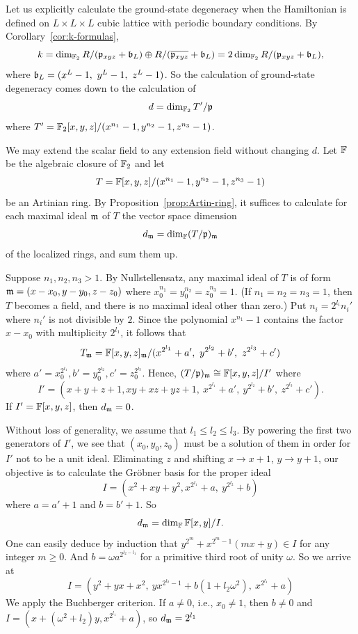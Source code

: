 Let us explicitly calculate the ground-state degeneracy
when the Hamiltonian is defined on $L \times L \times L$ 
cubic lattice with periodic boundary conditions.
By Corollary~\ref{cor:k-formulas},
\[
 k = \dim_{\mathbb{F}_2} R / (\mathfrak{p}_{xyz} + \mathfrak{b}_L) \oplus R / (\overline{\mathfrak{p}_{xyz}} + \mathfrak{b}_L) = 2 \dim_{\mathbb{F}_2} R / (\mathfrak{p}_{xyz} + \mathfrak{b}_L),
\]
where $\mathfrak{b}_L = ( x^L -1,~ y^L -1,~ z^L -1 )$.
So the calculation of ground-state degeneracy comes down to the calculation of
\[
 d = \dim_{\mathbb{F}_2} T' / \mathfrak{p}
\]
where $T' = \mathbb{F}_2[x,y,z]/(x^{n_1}-1, y^{n_2}-1, z^{n_3}-1 )$.

We may extend the scalar field to any extension field
without changing $d$.
Let $\mathbb{F}$ be the algebraic closure of $\mathbb{F}_2$ and let
\[
 T=\mathbb{F}[x,y,z]/(x^{n_1}-1, y^{n_2}-1, z^{n_3}-1 )
\]
be an Artinian ring.
By Proposition~\ref{prop:Artin-ring},
it suffices to calculate for each maximal ideal $\mathfrak{m}$ of $T$
the vector space dimension 
\[
d_{\mathfrak{m}} = \dim_{\mathbb{F}} (T / \mathfrak{p})_{\mathfrak{m}}
\]
of the localized rings, and sum them up.

Suppose $n_1,n_2,n_3 > 1$.
By Nullstellensatz, any maximal ideal of $T$ is of form
$\mathfrak{m}=(x-x_0,y-y_0,z-z_0)$ where $x_0^{n_1}=y_0^{n_2}=z_0^{n_3}=1$.
(If $n_1 = n_2 = n_3 = 1$, then $T$ becomes a field, and there is no maximal ideal other than zero.)
Put $n_i = 2^{l_i}n_i'$ where $n_i'$ is not divisible by $2$.
Since the polynomial $x^{n_1} -1$ contains the factor $x-x_0$ with multiplicity $2^{l_1}$,
it follows that
\[
 T_{\mathfrak{m}} = \mathbb{F} [x,y,z]_{\mathfrak{m}} / ( x^{2^{l_1}}+a',~ y^{2^{l_2}}+b',~ z^{2^{l_3}}+c')
\]
where $a' = x_0^{2^{l_1}}, b' = y_0^{2^{l_2}}, c' = z_0^{2^{l_3}}$.
Hence, $(T/\mathfrak{p})_{\mathfrak{m}} \cong \mathbb{F}[x,y,z] / I'$ where
\[
 I' = (x+y+z+1, xy+xz+yz+1 ,~ x^{2^{l_1}}+a',~ y^{2^{l_2}}+b',~ z^{2^{l_3}}+c').
\]
If $I' = \mathbb{F}[x,y,z]$, then $d_{\mathfrak{m}} = 0$.


Without loss of generality, we assume that $l_1 \le l_2 \le l_3$.
By powering the first two generators of $I'$,
we see that $(x_0,y_0,z_0)$ must be a solution of them in order for $I'$ not to be a unit ideal.
Eliminating $z$ and shifting $x \to x+1$, $y \to y+1$,
our objective is to calculate the Gr\"obner basis for the proper ideal
\[
 I = (x^2+xy+y^2, x^{2^{l_1}}+a,~ y^{2^{l_2}}+b )
\]
where $a=a'+1$ and $b = b'+1$. So
\[
 d_{\mathfrak{m}} = \dim_{\mathbb{F}} \mathbb{F}[x,y]/I.
\]
One can easily deduce by induction that $y^{2^m} + x^{2^m-1}(m x +y) \in I$ for any integer $m \ge 0$.
And $b = \omega a^{2^{l_2 - l_1}}$ for a primitive third root of unity $\omega$.
So we arrive at
\[
 I = ( y^2 + yx + x^2,~ yx^{2^{l_2} -1 } + b ( 1 + l_2 \omega^2 ),~ x^{2^{l_1}} + a )
\]
We apply the Buchberger criterion.
If $a \neq 0$, i.e., $x_0 \neq 1$,
then $b \neq 0$ and $I = (x+(\omega^2 + l_2)y, x^{2^{l_1}} + a)$,
so $d_{\mathfrak{m}} = 2^{l_1}$

